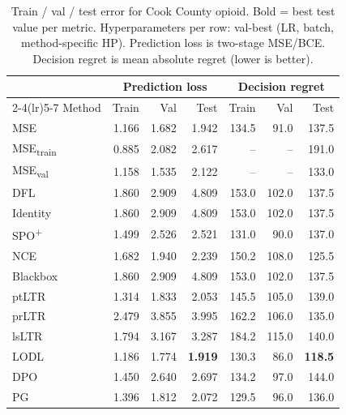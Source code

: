 \begin{table}[t]
\centering
\caption{Train / val / test error for Cook County opioid. Bold = best test value per metric. Hyperparameters per row: val-best (LR, batch, method-specific HP). Prediction loss is two-stage MSE/BCE. Decision regret is mean absolute regret (lower is better).}
\label{tab:err-cook-county}
\setlength{\tabcolsep}{4pt}
\renewcommand{\arraystretch}{1.05}
\begin{tabular}{@{}lrrrrrr@{}}
\toprule
& \multicolumn{3}{c}{Prediction loss} & \multicolumn{3}{c}{Decision regret} \\
\cmidrule(lr){2-4}\cmidrule(lr){5-7}
Method & Train & Val & Test & Train & Val & Test \\
\midrule
MSE & 1.166 & 1.682 & 1.942 & 134.5 & 91.0 & 137.5 \\
MSE\textsubscript{train} & 0.885 & 2.082 & 2.617 & -- & -- & 191.0 \\
MSE\textsubscript{val} & 1.158 & 1.535 & 2.122 & -- & -- & 133.0 \\
DFL & 1.860 & 2.909 & 4.809 & 153.0 & 102.0 & 137.5 \\
Identity & 1.860 & 2.909 & 4.809 & 153.0 & 102.0 & 137.5 \\
SPO\textsuperscript{+} & 1.499 & 2.526 & 2.521 & 131.0 & 90.0 & 137.0 \\
NCE & 1.682 & 1.940 & 2.239 & 150.2 & 108.0 & 125.5 \\
Blackbox & 1.860 & 2.909 & 4.809 & 153.0 & 102.0 & 137.5 \\
ptLTR & 1.314 & 1.833 & 2.053 & 145.5 & 105.0 & 139.0 \\
prLTR & 2.479 & 3.855 & 3.995 & 162.2 & 106.0 & 135.0 \\
lsLTR & 1.794 & 3.167 & 3.287 & 184.2 & 115.0 & 140.0 \\
LODL & 1.186 & 1.774 & \textbf{1.919} & 130.3 & 86.0 & \textbf{118.5} \\
DPO & 1.450 & 2.640 & 2.697 & 134.2 & 97.0 & 144.0 \\
PG & 1.396 & 1.812 & 2.072 & 129.5 & 96.0 & 136.0 \\
\bottomrule
\end{tabular}
\end{table}

